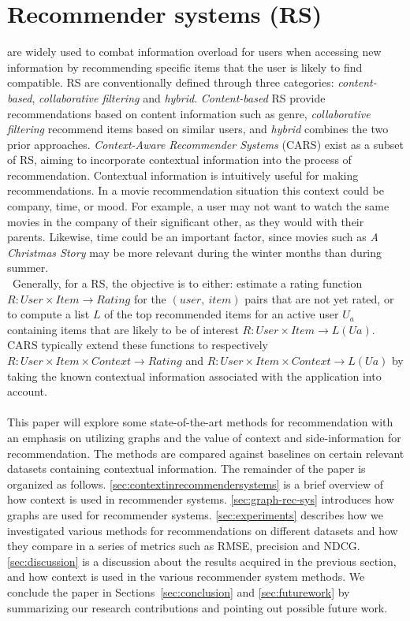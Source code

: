 \chapter{Recommender systems (RS)}\label{ch:introduction}
are widely used to combat information overload for users when accessing new information by recommending specific items that the user is likely to find compatible\cite{YouTubeNeural,IndustryPerspective}.
RS are conventionally defined through three categories: \textit{content-based}, \textit{collaborative filtering} and \textit{hybrid}.
\textit{Content-based} RS provide recommendations based on content information such as genre, \textit{collaborative filtering} recommend items based on similar users, and \textit{hybrid} combines the two prior approaches\cite{ContextSurvey2020}.
\textit{Context-Aware Recommender Systems} (CARS) exist as a subset of RS, aiming to incorporate contextual information into the process of recommendation.
Contextual information is intuitively useful for making recommendations.
In a movie recommendation situation this context could be company, time, or mood.
For example, a user may not want to watch the same movies in the company of their significant other, as they would with their parents.
Likewise, time could be an important factor, since movies such as \textit{A Christmas Story} may be more relevant during the winter months than during summer.\\\
Generally, for a RS, the objective is to either: estimate a rating function $R: User \times Item \rightarrow Rating$ for the $(user, \ item)$ pairs that are not yet rated, or to compute a list $L$ of the top recommended items for an active user $U_a$ containing items that are likely to be of interest $R: User \times Item \rightarrow L(Ua)$\cite{RecommenderHandbook2015}.
CARS typically extend these functions to respectively $R: User \times Item \times Context \rightarrow Rating$ and $R: User \times Item \times Context \rightarrow L(Ua)$ by taking the known contextual information associated with the application into account.
\\\\
This paper will explore some state-of-the-art methods for recommendation with an emphasis on utilizing graphs and the value of context and side-information for recommendation.
The methods are compared against baselines on certain relevant datasets containing contextual information.
The remainder of the paper is organized as follows. 
\autoref{sec:contextinrecommendersystems} is a brief overview of how context is used in recommender systems.
\autoref{sec:graph-rec-sys} introduces how graphs are used for recommender systems.
\autoref{sec:experiments} describes how we investigated various methods for recommendations on different datasets and how they compare in a series of metrics such as RMSE, precision and NDCG.
\autoref{sec:discussion} is a discussion about the results acquired in the previous section, and how context is used in the various recommender system methods.
We conclude the paper in Sections~\ref{sec:conclusion} and \ref{sec:futurework} by summarizing our research contributions and pointing out possible future work.
